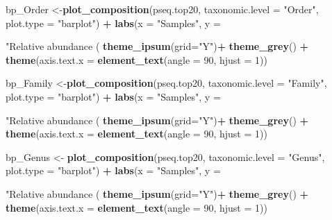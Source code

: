 \documentclass[]{article}
\newenvironment{Shaded}{\begin{snugshade}}{\end{snugshade}}
\newcommand{\DataTypeTok}[1]{\textcolor[rgb]{0.13,0.29,0.53}{#1}}
\newcommand{\DecValTok}[1]{\textcolor[rgb]{0.00,0.00,0.81}{#1}}
\newcommand{\KeywordTok}[1]{\textcolor[rgb]{0.13,0.29,0.53}{\textbf{#1}}}
\newcommand{\NormalTok}[1]{#1}
\newcommand{\OperatorTok}[1]{\textcolor[rgb]{0.81,0.36,0.00}{\textbf{#1}}}
\newcommand{\StringTok}[1]{\textcolor[rgb]{0.31,0.60,0.02}{#1}}
\begin{document}
\begin{Shaded}
\begin{Highlighting}[]
{{{\NormalTok{bp_Order <-}\KeywordTok{plot_composition}\NormalTok{(pseq.top20,}
                             \DataTypeTok{taxonomic.level =} \StringTok{"Order"}\NormalTok{, }\DataTypeTok{plot.type =} \StringTok{"barplot"}\NormalTok{) }\OperatorTok{+}
\StringTok{  }\KeywordTok{labs}\NormalTok{(}\DataTypeTok{x =} \StringTok{"Samples"}\NormalTok{, }\DataTypeTok{y =} \StringTok{"Relative abundance (%)"}\NormalTok{, }\DataTypeTok{title =} \StringTok{"Relative abundance data"}\NormalTok{, }\DataTypeTok{subtitle =} \StringTok{"Order"}\NormalTok{) }\OperatorTok{+}\StringTok{ }
\StringTok{  }\KeywordTok{theme_ipsum}\NormalTok{(}\DataTypeTok{grid=}\StringTok{"Y"}\NormalTok{)}\OperatorTok{+}\StringTok{ }\KeywordTok{theme_grey}\NormalTok{() }\OperatorTok{+}\StringTok{ }\KeywordTok{theme}\NormalTok{(}\DataTypeTok{axis.text.x =} \KeywordTok{element_text}\NormalTok{(}\DataTypeTok{angle =} \DecValTok{90}\NormalTok{, }\DataTypeTok{hjust =} \DecValTok{1}\NormalTok{))}


\NormalTok{bp_Family <-}\KeywordTok{plot_composition}\NormalTok{(pseq.top20,}
                             \DataTypeTok{taxonomic.level =} \StringTok{"Family"}\NormalTok{, }\DataTypeTok{plot.type =} \StringTok{"barplot"}\NormalTok{) }\OperatorTok{+}\StringTok{ }
\StringTok{                             }\KeywordTok{labs}\NormalTok{(}\DataTypeTok{x =} \StringTok{"Samples"}\NormalTok{, }\DataTypeTok{y =} \StringTok{"Relative abundance (%)"}\NormalTok{, }\DataTypeTok{title =} \StringTok{"Relative abundance data"}\NormalTok{, }\DataTypeTok{subtitle =} \StringTok{"Family"}\NormalTok{) }\OperatorTok{+}\StringTok{ }
\StringTok{                             }\KeywordTok{theme_ipsum}\NormalTok{(}\DataTypeTok{grid=}\StringTok{"Y"}\NormalTok{)}\OperatorTok{+}\StringTok{ }\KeywordTok{theme_grey}\NormalTok{() }\OperatorTok{+}\StringTok{ }\KeywordTok{theme}\NormalTok{(}\DataTypeTok{axis.text.x =} \KeywordTok{element_text}\NormalTok{(}\DataTypeTok{angle =} \DecValTok{90}\NormalTok{, }\DataTypeTok{hjust =} \DecValTok{1}\NormalTok{))}



\NormalTok{bp_Genus <-}\StringTok{ }\KeywordTok{plot_composition}\NormalTok{(pseq.top20,}
                      \DataTypeTok{taxonomic.level =} \StringTok{"Genus"}\NormalTok{, }\DataTypeTok{plot.type =} \StringTok{"barplot"}\NormalTok{) }\OperatorTok{+}
\StringTok{                      }\KeywordTok{labs}\NormalTok{(}\DataTypeTok{x =} \StringTok{"Samples"}\NormalTok{, }\DataTypeTok{y =} \StringTok{"Relative abundance (%)"}\NormalTok{, }\DataTypeTok{title =} \StringTok{"Relative abundance data"}\NormalTok{, }\DataTypeTok{subtitle =} \StringTok{"Genus"}\NormalTok{) }\OperatorTok{+}\StringTok{ }
\StringTok{                      }\KeywordTok{theme_ipsum}\NormalTok{(}\DataTypeTok{grid=}\StringTok{"Y"}\NormalTok{)}\OperatorTok{+}\StringTok{ }\KeywordTok{theme_grey}\NormalTok{() }\OperatorTok{+}\StringTok{ }\KeywordTok{theme}\NormalTok{(}\DataTypeTok{axis.text.x =} \KeywordTok{element_text}\NormalTok{(}\DataTypeTok{angle =} \DecValTok{90}\NormalTok{, }\DataTypeTok{hjust =} \DecValTok{1}\NormalTok{))}


}}}}}}
\end{Highlighting}
\end{Shaded}
\end{document}
